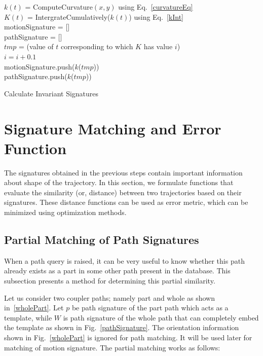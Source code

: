 \documentclass[twocolumn,10pt]{asme2ej}
\begin{document}
\begin{algorithm}
    $k(t)$ = ComputeCurvature$(x, y)$ using Eq.~\ref{curvatureEq} \\
    $K(t)$ = IntergrateCumulatively($k(t)$) using Eq.~\ref{kInt} \\
    motionSignature = [] \\
    pathSignature = [] \\
    {
      $tmp$ = (value of $t$ corresponding to which $K$ has value $i$) \\
      $i = i + 0.1$ \\
      motionSignature.push($k$($tmp$)) \\
      pathSignature.push($k$($tmp$))
    }
    \caption{Calculate Invariant Signatures}
    \label{alg_signature}
\end{algorithm}

\section{Signature Matching and Error Function}\label{sec_distanceMetric}
The signatures obtained in the previous steps contain important information about shape of the trajectory.
In this section, we formulate functions that evaluate the similarity (or, distance) between two trajectories based on their signatures.
These distance functions can be used as error metric, which can be minimized using optimization methods.

\subsection{Partial Matching of Path Signatures}\label{sec_ncc}
When a path query is raised, it can be very useful to know whether this path already exists as a part in some other path present in the database.
This subsection presents a method for determining this partial similarity.

Let us consider two coupler paths; namely part and whole as shown in~\ref{wholePart}.
Let $p$ be path signature of the part path which acts as a template, while $W$ is path signature of the whole path that can completely embed the template as shown in Fig.~\ref{pathSignature}. The orientation information shown in Fig.~\ref{wholePart} is ignored for path matching. It will be used later for matching of motion signature.
The partial matching works as follows:
\end{document}
